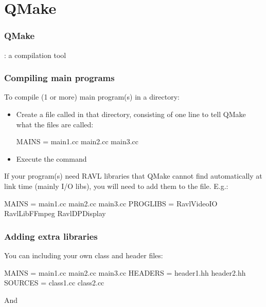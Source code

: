 \documentclass[landscape]{beamer}
\begin{document}
\section{QMake}

\begin{frame}[fragile]\frametitle{QMake}

\centerline{\huge {}: a compilation tool}
\end{frame}

\begin{frame}[fragile]\frametitle{Compiling main programs}

  To compile (1 or more) main program(s) in a directory:
  \begin{itemize}
    \pause\item Create a file called  in that directory,
    consisting of one line to tell QMake what the files are called:

\begin{Code}
  MAINS = main1.cc main2.cc main3.cc
\end{Code}

  \pause\item Execute the command 
  \end{itemize}

  \pause \vfill

  If your program(s) need RAVL libraries that QMake cannot find automatically
  at link time (mainly I/O libs), you will need to add them to the
   file.  E.g.:

\begin{Code}
  MAINS = main1.cc main2.cc main3.cc
  PROGLIBS = RavlVideoIO RavlLibFFmpeg RavlDPDisplay
\end{Code}
\end{frame}

\begin{frame}[fragile]\frametitle{Adding extra libraries}

  You can including your own class and header files:

  \vspace{2em}

\begin{Code}
  MAINS = main1.cc main2.cc main3.cc
  HEADERS = header1.hh header2.hh
  SOURCES = class1.cc class2.cc
\end{Code}

  \pause\vspace{2em}

  And 
\end{frame}
\end{document}
